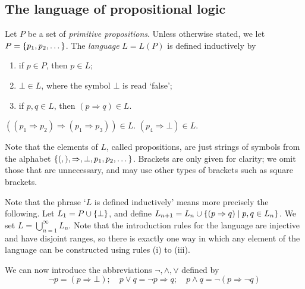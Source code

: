 \subsection{The language of propositional logic}
Let \( P \) be a set of \emph{primitive propositions}.
Unless otherwise stated, we let \( P = \qty{p_1, p_2, \dots} \).
The \emph{language} \( L = L(P) \) is defined inductively by
\begin{enumerate}
    \item if \( p \in P \), then \( p \in L \);
    \item \( \bot \in L \), where the symbol \( \bot \) is read `false';
    \item if \( p, q \in L \), then \( (p \Rightarrow q) \in L \).
\end{enumerate}
\begin{example}
    \( ((p_1 \Rightarrow p_2) \Rightarrow (p_1 \Rightarrow p_3)) \in L \).
    \( (p_4 \Rightarrow \bot) \in L \).
\end{example}
\begin{remark}
    Note that the elements of \( L \), called propositions, are just strings of symbols from the alphabet \( \qty{(, ), \Rightarrow, \bot, p_1, p_2, \dots} \).
    Brackets are only given for clarity; we omit those that are unnecessary, and may use other types of brackets such as square brackets.

    Note that the phrase `\( L \) is defined inductively' means more precisely the following.
    Let \( L_1 = P \cup \qty{\bot} \), and define \( L_{n+1} = L_n \cup \qty{(p \Rightarrow q) \mid p, q \in L_n} \).
    We set \( L = \bigcup_{n=1}^\infty L_n \).
    Note that the introduction rules for the language are injective and have disjoint ranges, so there is exactly one way in which any element of the language can be constructed using rules (i) to (iii).
\end{remark}
We can now introduce the abbreviations \( \neg, \wedge, \vee \) defined by
\[ \neg p = (p \Rightarrow \bot);\quad p \vee q = \neg p \Rightarrow q;\quad p \wedge q = \neg (p \Rightarrow \neg q) \]

